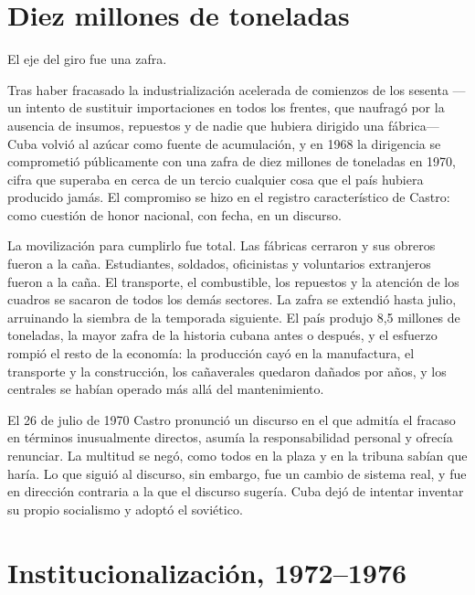 \section{Diez millones de toneladas}

El eje del giro fue una zafra.

Tras haber fracasado la industrialización acelerada de comienzos de los sesenta
---un intento de sustituir importaciones en todos los frentes, que naufragó por
la ausencia de insumos, repuestos y de nadie que hubiera dirigido una fábrica---
Cuba volvió al azúcar como fuente de acumulación, y en 1968 la dirigencia se
comprometió públicamente con una zafra de diez millones de toneladas en 1970,
cifra que superaba en cerca de un tercio cualquier cosa que el país hubiera
producido jamás. El compromiso se hizo en el registro característico de Castro:
como cuestión de honor nacional, con fecha, en un discurso.

La movilización para cumplirlo fue total. Las fábricas cerraron y sus obreros
fueron a la caña. Estudiantes, soldados, oficinistas y voluntarios extranjeros
fueron a la caña. El transporte, el combustible, los repuestos y la atención de
los cuadros se sacaron de todos los demás sectores. La zafra se extendió hasta
julio, arruinando la siembra de la temporada siguiente. El país produjo 8,5
millones de toneladas, la mayor zafra de la historia cubana antes o después, y el
esfuerzo rompió el resto de la economía: la producción cayó en la manufactura, el
transporte y la construcción, los cañaverales quedaron dañados por años, y los
centrales se habían operado más allá del mantenimiento.

El 26 de julio de 1970 Castro pronunció un discurso en el que admitía el fracaso
en términos inusualmente directos, asumía la responsabilidad personal y ofrecía
renunciar. La multitud se negó, como todos en la plaza y en la tribuna sabían que
haría. Lo que siguió al discurso, sin embargo, fue un cambio de sistema real, y
fue en dirección contraria a la que el discurso sugería. Cuba dejó de intentar
inventar su propio socialismo y adoptó el soviético.

\section{Institucionalización, 1972--1976}

